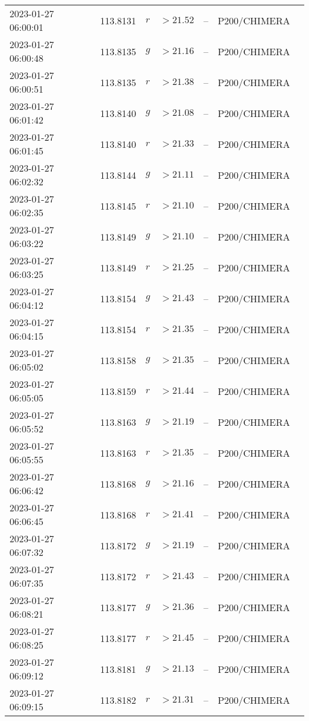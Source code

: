 \documentclass{nature_plusfigure}
\begin{document}
\begin{supplement}
\begin{center}
\begin{longtable}{lllllll}
2023-01-27 06:00:01 & 113.8131 & $r$ & $>21.52$ & -- & P200/CHIMERA &  \\ 
2023-01-27 06:00:48 & 113.8135 & $g$ & $>21.16$ & -- & P200/CHIMERA &  \\ 
2023-01-27 06:00:51 & 113.8135 & $r$ & $>21.38$ & -- & P200/CHIMERA &  \\ 
2023-01-27 06:01:42 & 113.8140 & $g$ & $>21.08$ & -- & P200/CHIMERA &  \\ 
2023-01-27 06:01:45 & 113.8140 & $r$ & $>21.33$ & -- & P200/CHIMERA &  \\ 
2023-01-27 06:02:32 & 113.8144 & $g$ & $>21.11$ & -- & P200/CHIMERA &  \\ 
2023-01-27 06:02:35 & 113.8145 & $r$ & $>21.10$ & -- & P200/CHIMERA &  \\ 
2023-01-27 06:03:22 & 113.8149 & $g$ & $>21.10$ & -- & P200/CHIMERA &  \\ 
2023-01-27 06:03:25 & 113.8149 & $r$ & $>21.25$ & -- & P200/CHIMERA &  \\ 
2023-01-27 06:04:12 & 113.8154 & $g$ & $>21.43$ & -- & P200/CHIMERA &  \\ 
2023-01-27 06:04:15 & 113.8154 & $r$ & $>21.35$ & -- & P200/CHIMERA &  \\ 
2023-01-27 06:05:02 & 113.8158 & $g$ & $>21.35$ & -- & P200/CHIMERA &  \\ 
2023-01-27 06:05:05 & 113.8159 & $r$ & $>21.44$ & -- & P200/CHIMERA &  \\ 
2023-01-27 06:05:52 & 113.8163 & $g$ & $>21.19$ & -- & P200/CHIMERA &  \\ 
2023-01-27 06:05:55 & 113.8163 & $r$ & $>21.35$ & -- & P200/CHIMERA &  \\ 
2023-01-27 06:06:42 & 113.8168 & $g$ & $>21.16$ & -- & P200/CHIMERA &  \\ 
2023-01-27 06:06:45 & 113.8168 & $r$ & $>21.41$ & -- & P200/CHIMERA &  \\ 
2023-01-27 06:07:32 & 113.8172 & $g$ & $>21.19$ & -- & P200/CHIMERA &  \\ 
2023-01-27 06:07:35 & 113.8172 & $r$ & $>21.43$ & -- & P200/CHIMERA &  \\ 
2023-01-27 06:08:21 & 113.8177 & $g$ & $>21.36$ & -- & P200/CHIMERA &  \\ 
2023-01-27 06:08:25 & 113.8177 & $r$ & $>21.45$ & -- & P200/CHIMERA &  \\ 
2023-01-27 06:09:12 & 113.8181 & $g$ & $>21.13$ & -- & P200/CHIMERA &  \\ 
2023-01-27 06:09:15 & 113.8182 & $r$ & $>21.31$ & -- & P200/CHIMERA &  \\ 

\end{longtable}
\end{center}
\end{supplement}
\end{document}

